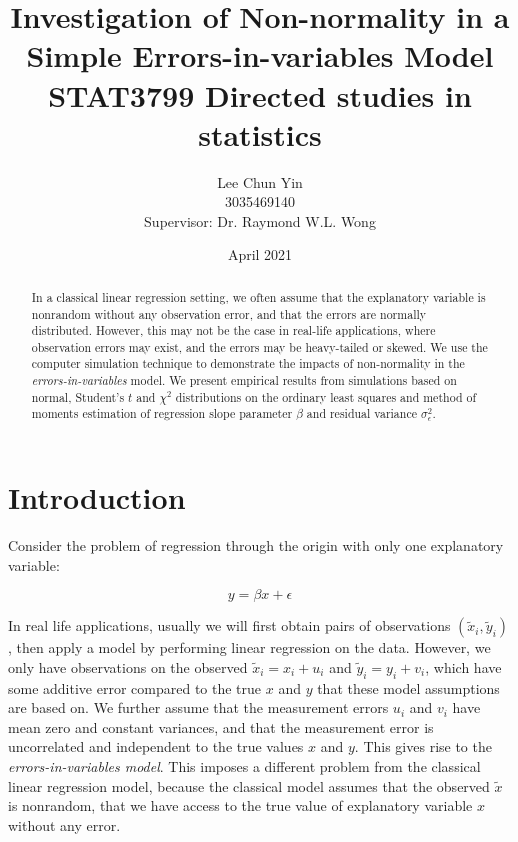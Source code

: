 \documentclass{article}
\title{Investigation of Non-normality in a Simple Errors-in-variables Model\\[1cm]
STAT3799 Directed studies in statistics}
\author{Lee Chun Yin\\
3035469140\\[1cm]{\small Supervisor: Dr. Raymond W.L. Wong}
}
\date{April 2021}
\begin{document}
\maketitle

\begin{abstract}

In a classical linear regression setting, we often assume that the explanatory variable is nonrandom without any observation error, and that the errors are normally distributed.
However, this may not be the case in real-life applications, where observation errors may exist, and the errors may be heavy-tailed or skewed.
We use the computer simulation technique to demonstrate the impacts of non-normality in the \textit{errors-in-variables} model.
We present empirical results from simulations based on normal, Student's $t$ and $\chi^2$ distributions on the ordinary least squares and method of moments estimation of regression slope parameter $\beta$ and residual variance $\sigma^2_\epsilon$.

\end{abstract}

\section{Introduction}

Consider the problem of regression through the origin with only one explanatory variable:

\begin{equation}
y = \beta x + \epsilon
\end{equation}

In real life applications, usually we will first obtain pairs of observations $(\tilde{x}_i, \tilde{y}_i)$, then apply a model by performing linear regression on the data.
However, we only have observations on the observed $\tilde{x}_i = x_i + u_i$ and $\tilde{y}_i = y_i + v_i$, which have some additive error compared to the true $x$ and $y$ that these model assumptions are based on.
We further assume that the measurement errors $u_i$ and $v_i$ have mean zero and constant variances, and that the measurement error is uncorrelated and independent to the true values $x$ and $y$.
This gives rise to the \textit{errors-in-variables model}.
This imposes a different problem from the classical linear regression model, because the classical model assumes that the observed $\tilde{x}$ is nonrandom, that we have access to the true value of explanatory variable $x$ without any error. 
\end{document}

